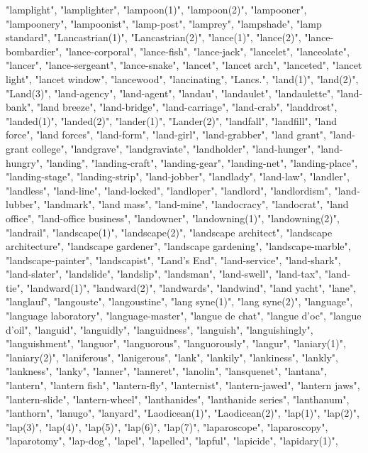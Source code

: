 "lamplight",
"lamplighter",
"lampoon(1)",
"lampoon(2)",
"lampooner",
"lampoonery",
"lampoonist",
"lamp-post",
"lamprey",
"lampshade",
"lamp standard",
"Lancastrian(1)",
"Lancastrian(2)",
"lance(1)",
"lance(2)",
"lance-bombardier",
"lance-corporal",
"lance-fish",
"lance-jack",
"lancelet",
"lanceolate",
"lancer",
"lance-sergeant",
"lance-snake",
"lancet",
"lancet arch",
"lanceted",
"lancet light",
"lancet window",
"lancewood",
"lancinating",
"Lancs.",
"land(1)",
"land(2)",
"Land(3)",
"land-agency",
"land-agent",
"landau",
"landaulet",
"landaulette",
"land-bank",
"land breeze",
"land-bridge",
"land-carriage",
"land-crab",
"landdrost",
"landed(1)",
"landed(2)",
"lander(1)",
"Lander(2)",
"landfall",
"landfill",
"land force",
"land forces",
"land-form",
"land-girl",
"land-grabber",
"land grant",
"land-grant college",
"landgrave",
"landgraviate",
"landholder",
"land-hunger",
"land-hungry",
"landing",
"landing-craft",
"landing-gear",
"landing-net",
"landing-place",
"landing-stage",
"landing-strip",
"land-jobber",
"landlady",
"land-law",
"landler",
"landless",
"land-line",
"land-locked",
"landloper",
"landlord",
"landlordism",
"land-lubber",
"landmark",
"land mass",
"land-mine",
"landocracy",
"landocrat",
"land office",
"land-office business",
"landowner",
"landowning(1)",
"landowning(2)",
"landrail",
"landscape(1)",
"landscape(2)",
"landscape architect",
"landscape architecture",
"landscape gardener",
"landscape gardening",
"landscape-marble",
"landscape-painter",
"landscapist",
"Land's End",
"land-service",
"land-shark",
"land-slater",
"landslide",
"landslip",
"landsman",
"land-swell",
"land-tax",
"land-tie",
"landward(1)",
"landward(2)",
"landwards",
"landwind",
"land yacht",
"lane",
"langlauf",
"langouste",
"langoustine",
"lang syne(1)",
"lang syne(2)",
"language",
"language laboratory",
"language-master",
"langue de chat",
"langue d'oc",
"langue d'oil",
"languid",
"languidly",
"languidness",
"languish",
"languishingly",
"languishment",
"languor",
"languorous",
"languorously",
"langur",
"laniary(1)",
"laniary(2)",
"laniferous",
"lanigerous",
"lank",
"lankily",
"lankiness",
"lankly",
"lankness",
"lanky",
"lanner",
"lanneret",
"lanolin",
"lansquenet",
"lantana",
"lantern",
"lantern fish",
"lantern-fly",
"lanternist",
"lantern-jawed",
"lantern jaws",
"lantern-slide",
"lantern-wheel",
"lanthanides",
"lanthanide series",
"lanthanum",
"lanthorn",
"lanugo",
"lanyard",
"Laodicean(1)",
"Laodicean(2)",
"lap(1)",
"lap(2)",
"lap(3)",
"lap(4)",
"lap(5)",
"lap(6)",
"lap(7)",
"laparoscope",
"laparoscopy",
"laparotomy",
"lap-dog",
"lapel",
"lapelled",
"lapful",
"lapicide",
"lapidary(1)",
